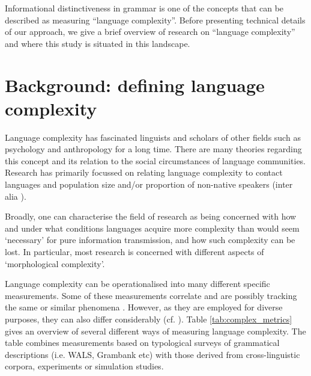 \documentclass[USenglish]{article}
\begin{document}
Informational distinctiveness in grammar is one of the concepts that can be described as measuring ``language complexity''.
Before presenting technical details of our approach, we give a brief overview of research on ``language complexity'' and where this study is situated in this landscape.

\section{Background: defining language complexity}\label{sec:background}
Language complexity has fascinated linguists and scholars of other fields such as psychology and anthropology for a long time. 
There are many theories regarding this concept and its relation to the social circumstances of language communities. 
Research has primarily focussed on relating language complexity to contact languages \citep{mcwhorter_2003} and population size and/or proportion of non-native speakers (inter alia \citet{wray2007consequences, dahl2004growth, lupyan2010language, bentz2013languages, bentz2015adaptive, raviv2019larger, koplenig2019language, shcherbakova2023societies}).

Broadly, one can characterise the field of research as being concerned with how and under what conditions languages acquire more complexity than would seem `necessary' for pure information transmission, and how such complexity can be lost. In particular, most research is concerned with different aspects of `morphological complexity'.

Language complexity can be operationalised into many different specific measurements. 
Some of these measurements correlate and are possibly tracking the same or similar phenomena \citep{bentz2016comparison, bentz2023complexity, ccoltekin2023complexity}. 
However, as they are employed for diverse purposes, they can also differ considerably (cf. \citet{lupyan2024cautionary}).
Table \ref{tab:complex_metrics} gives an overview of several different ways of measuring language complexity. 
The table combines measurements based on typological surveys of grammatical descriptions (i.e. WALS, Grambank etc) with those derived from cross-linguistic corpora, experiments or simulation studies.
\end{document}
